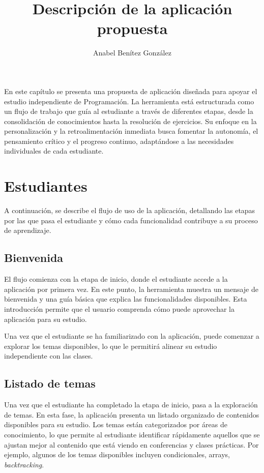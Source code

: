 \documentclass{article}
\title{Descripción de la aplicación propuesta}
\author{Anabel Benítez González}
\date{}
\begin{document}
\tableofcontents
\maketitle

En este capítulo se presenta una propuesta de aplicación diseñada para apoyar el estudio independiente de Programación. La herramienta está estructurada como un flujo de trabajo que guía al estudiante a través de diferentes etapas, desde la consolidación de conocimientos hasta la resolución de ejercicios. Su enfoque en la personalización y la retroalimentación inmediata busca fomentar la autonomía, el pensamiento crítico y el progreso continuo, adaptándose a las necesidades individuales de cada estudiante.

\section{Estudiantes}

A continuación, se describe el flujo de uso de la aplicación, detallando las etapas por las que pasa el estudiante y cómo cada funcionalidad contribuye a su proceso de aprendizaje.

\subsection{Bienvenida}
El flujo comienza con la etapa de inicio, donde el estudiante accede a la aplicación por primera vez. En este punto, la herramienta muestra un mensaje de bienvenida y una guía básica que explica las funcionalidades disponibles. Esta introducción permite que el usuario comprenda cómo puede aprovechar la aplicación para su estudio.

Una vez que el estudiante se ha familiarizado con la aplicación, puede comenzar a explorar los temas disponibles, lo que le permitirá alinear su estudio independiente con las clases.

\subsection{Listado de temas}

Una vez que el estudiante ha completado la etapa de inicio, pasa a la exploración de temas. En esta fase, la aplicación presenta un listado organizado de contenidos disponibles para su estudio. Los temas están categorizados por áreas de conocimiento, lo que permite al estudiante identificar rápidamente aquellos que se ajustan mejor al contenido que está viendo en conferencias y clases prácticas. Por ejemplo, algunos de los temas disponibles incluyen condicionales, arrays, \textit{backtracking}.
\end{document}
